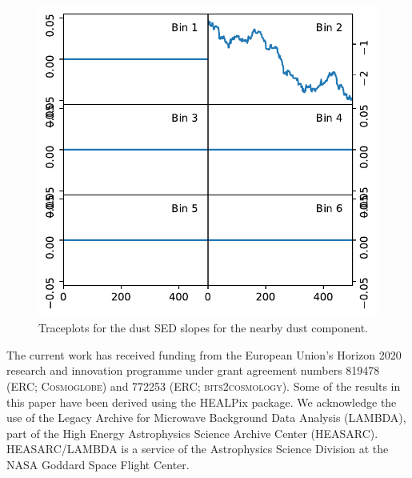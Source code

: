 \documentclass{aa}
\begin{document}
\begin{figure}
    \centering
    \includegraphics[width=\columnwidth]{"figures/traceplots_dust_sed_slopes_nearby_dust.pdf"}
    \caption{Traceplots for the dust SED slopes for the nearby dust component.}
    \label{fig:traceplots_dust_sed_slopes_nearbydust}
\end{figure}


\blindtext





\begin{acknowledgements}
 The current work has received funding from the European
  Union’s Horizon 2020 research and innovation programme under grant
  agreement numbers 819478 (ERC; \textsc{Cosmoglobe}) and 772253 (ERC;
  \textsc{bits2cosmology}). Some of the results in this paper have been derived using the HEALPix \citep{HEALPIX} package.
  We acknowledge the use of the Legacy Archive for Microwave Background Data
  Analysis (LAMBDA), part of the High Energy Astrophysics Science Archive Center
  (HEASARC). HEASARC/LAMBDA is a service of the Astrophysics Science Division at
  the NASA Goddard Space Flight Center.  
\end{acknowledgements}


%



\end{document}
